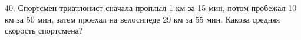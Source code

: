 40. Спортсмен-триатлонист сначала проплыл 1 км за 15 мин, потом пробежал 10 км за 50 мин, затем проехал на велосипеде 29 км за 55 мин. Какова средняя скорость спортсмена?\\
